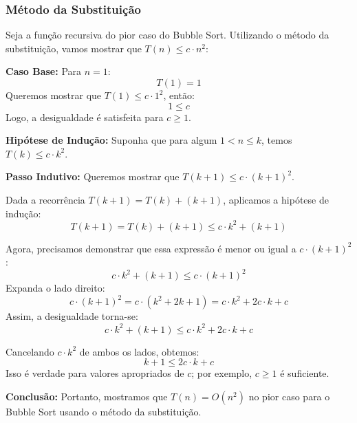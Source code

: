 \subsubsection{Método da Substituição}

Seja a função recursiva do pior caso do Bubble Sort. Utilizando o método da substituição, vamos mostrar que \( T(n) \leq c \cdot n^2 \):

\textbf{Caso Base:} Para \( n = 1 \):
\[
T(1) = 1
\]
Queremos mostrar que \( T(1) \leq c \cdot 1^2 \), então:
\[
1 \leq c
\]
Logo, a desigualdade é satisfeita para \( c \geq 1 \).

\textbf{Hipótese de Indução:} Suponha que para algum \( 1 < n \leq k \), temos \( T(k) \leq c \cdot k^2 \).

\textbf{Passo Indutivo:} Queremos mostrar que \( T(k + 1) \leq c \cdot (k + 1)^2 \).

Dada a recorrência \( T(k + 1) = T(k) + (k + 1) \), aplicamos a hipótese de indução:
\[
T(k + 1) = T(k) + (k + 1) \leq c \cdot k^2 + (k + 1)
\]

Agora, precisamos demonstrar que essa expressão é menor ou igual a \( c \cdot (k + 1)^2 \):
\[
c \cdot k^2 + (k + 1) \leq c \cdot (k + 1)^2
\]
Expanda o lado direito:
\[
c \cdot (k + 1)^2 = c \cdot (k^2 + 2k + 1) = c \cdot k^2 + 2c \cdot k + c
\]
Assim, a desigualdade torna-se:
\[
c \cdot k^2 + (k + 1) \leq c \cdot k^2 + 2c \cdot k + c
\]

Cancelando \( c \cdot k^2 \) de ambos os lados, obtemos:
\[
k + 1 \leq 2c \cdot k + c
\]
Isso é verdade para valores apropriados de \( c \); por exemplo, \( c \geq 1 \) é suficiente.

\textbf{Conclusão:} Portanto, mostramos que \( T(n) = O(n^2) \) no pior caso para o Bubble Sort usando o método da substituição.
